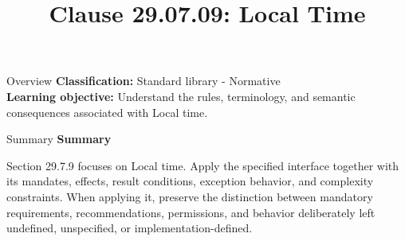 \documentclass[10pt,letterpaper]{article}
\title{Clause 29.07.09: Local Time}
\author{}
\date{}
\begin{document}
\maketitle
\begin{CornellOverviewBox}{Overview}
\textbf{Classification:} Standard library - Normative\\[2pt]
\textbf{Learning objective:} Understand the rules, terminology, and semantic consequences associated with Local time.
\end{CornellOverviewBox}\begin{CornellSummaryBox}{Summary}
{\sffamily\bfseries\color{Accent} Summary}\par\vspace{3pt}Section 29.7.9 focuses on Local time. Apply the specified interface together with its mandates, effects, result conditions, exception behavior, and complexity constraints. When applying it, preserve the distinction between mandatory requirements, recommendations, permissions, and behavior deliberately left undefined, unspecified, or implementation-defined.
\end{CornellSummaryBox}
\end{document}
